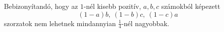 Bebizonyítandó, hogy az $1$-nél kisebb pozitív, $a,b,c$ számokból képezett
$$
(1-a)b,\ (1-b)c,\ (1-c)a
$$
szorzatok nem lehetnek mindannyian $\frac{1}{4}$-nél nagyobbak.
